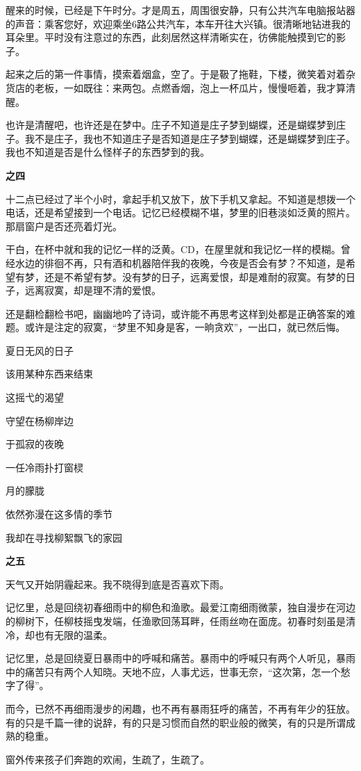 \pskip
醒来的时候，已经是下午时分。才是周五，周围很安静，只有公共汽车电脑报站器的声音：乘客您好，欢迎乘坐6路公共汽车，本车开往大兴镇。很清晰地钻进我的耳朵里。平时没有注意过的东西，此刻居然这样清晰实在，彷佛能触摸到它的影子。

\vspace{0.75em}
起来之后的第一件事情，摸索着烟盒，空了。于是靸了拖鞋，下楼，微笑着对着杂货店的老板，一如既往：来两包。点燃香烟，泡上一杯瓜片，慢慢咂着，我才算清醒。

\pskip
也许是清醒吧，也许还是在梦中。庄子不知道是庄子梦到蝴蝶，还是蝴蝶梦到庄子。我不是庄子，我也不知道庄子是否知道是庄子梦到蝴蝶，还是蝴蝶梦到庄子。我也不知道是否是什么怪样子的东西梦到的我。
	
\pskip
\textbf{之四}

\pskip
十二点已经过了半个小时，拿起手机又放下，放下手机又拿起。不知道是想拨一个电话，还是希望接到一个电话。记忆已经模糊不堪，梦里的旧巷淡如泛黄的照片。那扇窗户是否还亮着灯光。

\pskip
干白，在杯中就和我的记忆一样的泛黄。CD，在屋里就和我记忆一样的模糊。曾经水边的徘徊不再，只有酒和机器陪伴我的夜晚，今夜是否会有梦？不知道，是希望有梦，还是不希望有梦。没有梦的日子，远离爱恨，却是难耐的寂寞。有梦的日子，远离寂寞，却是理不清的爱恨。
	
\pskip
还是翻检翻检书吧，幽幽地吟了诗词，或许能不再思考这样到处都是正确答案的难题。或许是注定的寂寞，“梦里不知身是客，一晌贪欢”，一出口，就已然后悔。

\pskip
夏日无风的日子

该用某种东西来结束

这摇弋的渴望

\pskip	
守望在杨柳岸边

于孤寂的夜晚

一任冷雨扑打窗棂

\pskip
月的朦胧

依然弥漫在这多情的季节

我却在寻找柳絮飘飞的家园

\pskip
\textbf{之五}

\pskip
天气又开始阴霾起来。我不晓得到底是否喜欢下雨。

\pskip
记忆里，总是回绕初春细雨中的柳色和渔歌。最爱江南细雨微蒙，独自漫步在河边的柳树下，任柳枝摇曳发端，任渔歌回荡耳畔，任雨丝吻在面庞。初春时刻虽是清冷，却也有无限的温柔。

\pskip
记忆里，总是回绕夏日暴雨中的呼喊和痛苦。暴雨中的呼喊只有两个人听见，暴雨中的痛苦只有两个人知晓。天地不应，人事尤远，世事无奈，“这次第，怎一个愁字了得”。

\pskip
而今，已然不再细雨漫步的闲趣，也不再有暴雨狂呼的痛苦，不再有年少的狂放。有的只是千篇一律的说辞，有的只是习惯而自然的职业般的微笑，有的只是所谓成熟的稳重。

\pskip
窗外传来孩子们奔跑的欢闹，生疏了，生疏了。